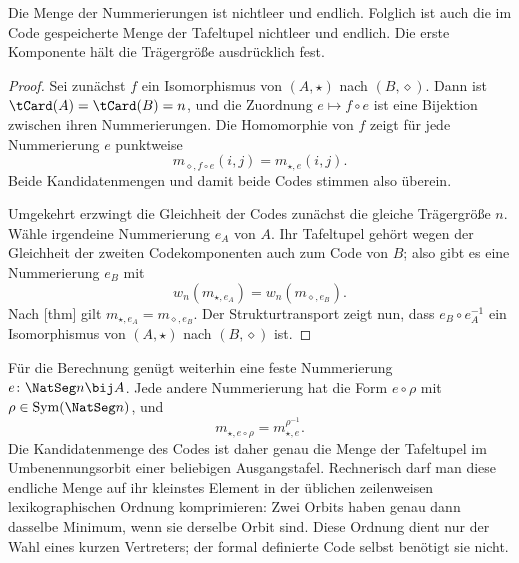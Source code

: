 \documentclass[main.tex]{subfiles}
\begin{document}
Die Menge der Nummerierungen ist nichtleer und endlich.  Folglich ist auch
die im Code gespeicherte Menge der Tafeltupel nichtleer und endlich.  Die
erste Komponente hält die Trägergröße ausdrücklich fest.

\begin{proof}
Sei zunächst \(f\) ein Isomorphismus von \((A,\star)\) nach
\((B,\diamond)\).  Dann ist \(\tCard(A)=\tCard(B)=n\), und die Zuordnung
\(e\mapsto f\circ e\) ist eine Bijektion zwischen ihren Nummerierungen.  Die
Homomorphie von \(f\) zeigt für jede Nummerierung \(e\) punktweise
\[
  m_{\diamond,f\circ e}(i,j)=m_{\star,e}(i,j).
\]
Beide Kandidatenmengen und damit beide Codes stimmen also überein.

Umgekehrt erzwingt die Gleichheit der Codes zunächst die gleiche Trägergröße
\(n\).  Wähle irgendeine Nummerierung \(e_A\) von \(A\).  Ihr Tafeltupel
gehört wegen der Gleichheit der zweiten Codekomponenten auch zum Code von
\(B\); also gibt es eine Nummerierung \(e_B\) mit
\[
  w_n(m_{\star,e_A})=w_n(m_{\diamond,e_B}).
\]
Nach
[thm] gilt
\(m_{\star,e_A}=m_{\diamond,e_B}\).  Der Strukturtransport zeigt nun, dass
\(e_B\circ e_A^{-1}\) ein Isomorphismus von \((A,\star)\) nach
\((B,\diamond)\) ist.
\end{proof}

Für die Berechnung genügt weiterhin eine feste Nummerierung
\(e\colon\NatSeg n\bij A\).  Jede andere Nummerierung hat die Form
\(e\circ\rho\) mit \(\rho\in\operatorname{Sym}(\NatSeg n)\), und
\[
  m_{\star,e\circ\rho}=m_{\star,e}^{\rho^{-1}}.
\]
Die Kandidatenmenge des Codes ist daher genau die Menge der Tafeltupel im
Umbenennungsorbit einer beliebigen Ausgangstafel.  Rechnerisch darf man diese
endliche Menge auf ihr kleinstes Element in der üblichen zeilenweisen
lexikographischen Ordnung komprimieren: Zwei Orbits haben genau dann dasselbe
Minimum, wenn sie derselbe Orbit sind.  Diese Ordnung dient nur der Wahl eines
kurzen Vertreters; der formal definierte Code selbst benötigt sie nicht.
\end{document}
